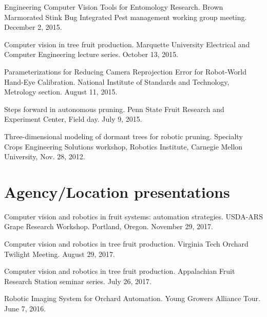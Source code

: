 \documentclass[letterpaper,11pt]{article}
\begin{document}
\begin{enumerate}[leftmargin=*,label={[\arabic*]}]
\item{ Engineering Computer Vision Tools for Entomology Research.  Brown Marmorated Stink Bug Integrated Pest management working group meeting. December 2, 2015.}

\item{ Computer vision in tree fruit production.  Marquette University Electrical and Computer Engineering lecture series.  October 13, 2015.}

\item{ Parameterizations for Reducing Camera Reprojection Error for Robot-World Hand-Eye Calibration. National Institute of Standards and Technology, Metrology section. August 11, 2015.}

\item{ Steps forward in autonomous pruning.  Penn State Fruit Research and Experiment Center, Field day. July 9, 2015.}

\item{ Three-dimensional modeling of dormant trees for robotic pruning. Specialty Crops Engineering Solutions workshop, Robotics Institute, Carnegie Mellon University, Nov. 28, 2012.}
\end{enumerate}

\section{Agency/Location presentations}
\begin{enumerate}[noitemsep, leftmargin=*,label={[\arabic*]}]
\item{Computer vision and robotics in fruit systems: automation strategies.  USDA-ARS Grape Research Workshop.  Portland, Oregon.  November 29, 2017. }

\item{ Computer vision and robotics in tree fruit production.  Virginia Tech Orchard Twilight Meeting. August 29, 2017.}

\item{ Computer vision and robotics in tree fruit production.  Appalachian Fruit Research Station seminar series. July 26, 2017.}

\item{ Robotic Imaging System for Orchard Automation. Young Growers Alliance Tour. June 7, 2016.}
\end{enumerate}

\end{document}
